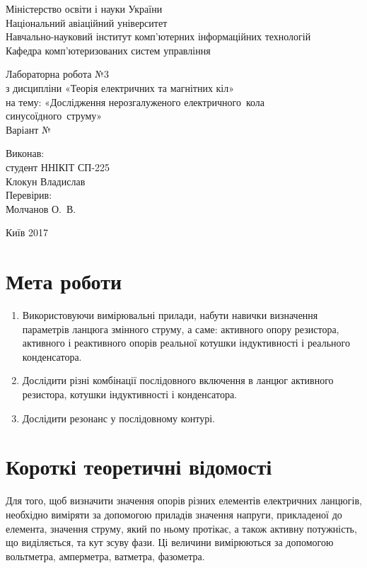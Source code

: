 \documentclass[a4paper,oneside,DIV=10,12pt]{scrartcl}
\begin{document}
	\begin{titlepage}
		\begin{center}
			Міністерство освіти і науки України\\
			Національний авіаційний університет\\
			Навчально-науковий інститут комп'ютерних інформаційних технологій\\
			Кафедра комп'ютеризованих систем управління
			
			\vspace{\fill}
				Лабораторна робота №3\\
				з дисципліни «Теорія електричних та магнітних кіл»\\
				на тему: «Дослідження нерозгалуженого електричного~кола синусоїдного~струму»\\
				Варіант №
				
			\vspace{\fill}
			
			\begin{flushright}
				Виконав:\\
				студент ННІКІТ СП-225\\
				Клокун Владислав\\
				Перевірив:\\
				Молчанов О.~В.
			\end{flushright}
			Київ 2017
		\end{center}
	\end{titlepage}
	
	\section{Мета роботи}
		\begin{enumerate}
			\item Використовуючи вимірювальні прилади, набути навички визначення параметрів ланцюга змінного струму, а саме: активного опору резистора, активного і реактивного опорів реальної котушки індуктивності і реального конденсатора.
			\item Дослідити різні комбінації послідовного включення в ланцюг активного резистора, котушки індуктивності і конденсатора.
			\item Дослідити резонанс у послідовному контурі.
		\end{enumerate}
		
	\section{Короткі теоретичні відомості}
		Для того, щоб визначити значення опорів різних елементів електричних ланцюгів, необхідно виміряти за допомогою приладів значення напруги, прикладеної до елемента, значення струму, який по ньому протікає, а також активну потужність, що виділяється, та кут зсуву фази. Ці величини вимірюються за допомогою вольтметра, амперметра, ватметра, фазометра.
		
\end{document}
